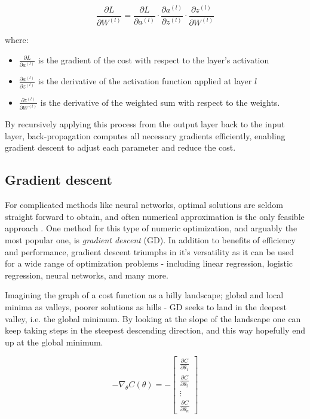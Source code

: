 \begin{equation}
\frac{\partial L}{\partial W^{(l)}} = \frac{\partial L}{\partial a^{(l)}} \cdot \frac{\partial a^{(l)}}{\partial z^{(l)}} \cdot \frac{\partial z^{(l)}}{\partial W^{(l)}}
\end{equation}

where:
\begin{itemize}[label=--]
    \item $\frac{\partial L}{\partial a^{(l)}}$ is the gradient of the cost with respect to the layer’s activation
    \item $\frac{\partial a^{(l)}}{\partial z^{(l)}}$ is the derivative of the activation function applied at layer $l$
    \item $\frac{\partial z^{(l)}}{\partial W^{(l)}}$ is the derivative of the weighted sum with respect to the weights.
\end{itemize}

By recursively applying this process from the output layer back to the input layer, back-propagation computes all necessary gradients efficiently, enabling gradient descent to adjust each parameter and reduce the cost.

\subsection{Gradient descent } \label{sec:gd}
For complicated methods like neural networks, optimal solutions are seldom straight forward to obtain, and often numerical approximation is the only feasible approach \citep[Week 40]{morten}.  
One method for this type of numeric optimization, and arguably the most popular one, is \textit{gradient descent} (GD). In addition to benefits of efficiency and performance, gradient descent triumphs in it's versatility as it can be used for a wide range of optimization problems - including linear regression, logistic regression, neural networks, and many more. 

Imagining the graph of a cost function as a hilly landscape; global and local minima as valleys, poorer solutions as hills - GD seeks to land in the deepest valley, i.e. the global minimum. 
By looking at the slope of the landscape one can keep taking steps in the steepest descending direction, and this way hopefully end up at the global minimum.

\begin{equation}\label{eq:gd}
    -\nabla_\theta C(\theta) = -\begin{bmatrix}
\frac{\partial C}{\partial \theta_1} \\
\frac{\partial C}{\partial \theta_2} \\
\vdots \\
\frac{\partial C}{\partial \theta_n}
\end{bmatrix}
\end{equation}

